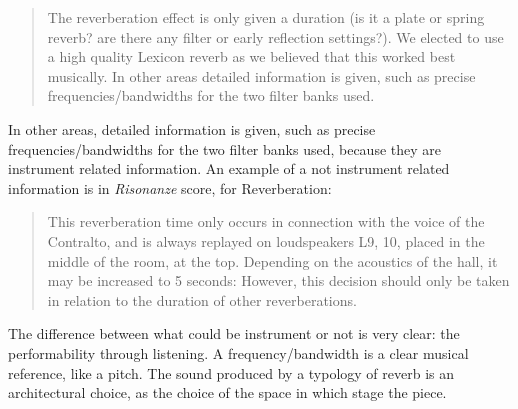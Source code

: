 \documentclass[twoside,a4paper]{article}
\begin{document}
\begin{quote}
The reverberation effect is only given a duration (is it a plate or spring reverb? are there any filter or early reflection settings?). We elected to use a high quality Lexicon reverb as we believed that this worked best musically. In other areas detailed information is given, such as precise frequencies/bandwidths for the two filter banks used\cite{rw05}.
\end{quote}

In other areas, detailed information is given, such as precise frequencies/bandwidths for the two filter banks used, because they are instrument related information. An example of a not instrument related information is in \emph{Risonanze} score, for Reverberation: 

\begin{quote}
This reverberation time only occurs in connection with the voice of the Contralto, and is always replayed on loudspeakers L9, 10, placed in the middle of the room, at the top. Depending on the acoustics of the hall, it may be increased to 5 seconds: However, this decision should only be taken in relation to the duration of other reverberations\cite{nlre87}.
\end{quote}

The difference between what could be instrument or not is very clear: the performability through listening. A frequency/bandwidth is a clear musical reference, like a pitch. The sound produced by a typology of reverb is an architectural choice, as the choice of the space in which stage the piece. 
\end{document}
